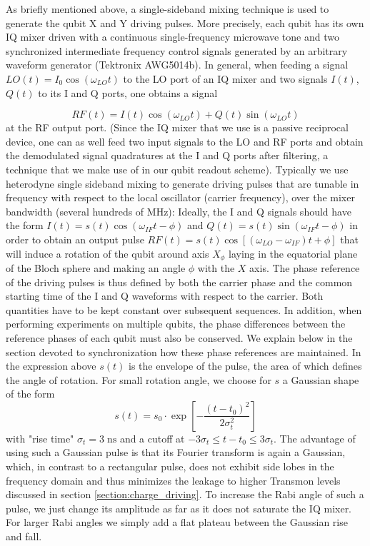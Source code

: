 As briefly mentioned above, a single-sideband mixing technique is used to generate the qubit X and Y driving pulses. More precisely, each qubit has its own IQ mixer driven with a continuous single-frequency microwave tone and two synchronized intermediate frequency control signals generated by an arbitrary waveform generator (Tektronix AWG5014b). In general, when feeding a signal $LO(t) = I_0 \cos{(\omega_{LO} t )}$ to the LO port of an IQ mixer and two signals $I(t)$, $Q(t)$ to its I and Q ports, one obtains a signal

\begin{equation}
RF(t) = I(t)\cos{(\omega_{LO} t)}+Q(t)\sin{(\omega_{LO} t)} \label{eq:iqMixer}
\end{equation}
at the RF output port. (Since the IQ mixer that we use is a passive reciprocal device, one can as well feed two input signals to the LO and RF ports and obtain the demodulated signal quadratures at the I and Q ports after filtering, a technique that we make use of in our qubit readout scheme). Typically we use heterodyne single sideband mixing to generate driving pulses that are tunable in frequency with respect to the local oscillator (carrier  frequency), over the mixer bandwidth (several hundreds of MHz): Ideally, the I and Q signals should have the form $I(t)=s(t)\cos(\omega_{IF} t-\phi)$ and $Q(t)=s(t)\sin(\omega_{IF} t-\phi)$ in order to obtain an output pulse $RF(t)=s(t)\cos[(\omega_{LO}-\omega_{IF})t +\phi]$ that will induce a rotation of the qubit around axis $X_{\phi}$ laying in the equatorial plane of the Bloch sphere and making an angle $\phi$ with the $X$ axis. The phase reference of the driving pulses is thus defined by both the carrier phase and the common starting time of the I and Q waveforms with respect to the carrier. Both quantities have to be kept constant over subsequent sequences. In addition, when performing experiments on multiple qubits, the phase differences between the reference phases of each qubit must also be conserved.  We explain below in the section devoted to synchronization how these phase references are maintained. In the expression above $s(t)$ is the envelope of the pulse, the area of which defines the angle of rotation. For small rotation angle, we choose for $s$ a Gaussian shape of the form
%
\begin{equation}
s(t) = s_0\cdot\exp{\left[-\frac{(t-t_0)^2}{2\sigma_t^2}\right]}
\end{equation}
%
with "rise time" $\sigma_t=3\;\mathrm{ns}$ and a cutoff at $-3\sigma_t\le t-t_0\le 3\sigma_t$. The advantage of using such a Gaussian pulse \citep{bauer_gaussian_1984} is that its Fourier transform is again a Gaussian, which, in contrast to a rectangular pulse, does not exhibit side lobes in the frequency domain and thus minimizes the leakage to higher Transmon levels discussed in section \ref{section:charge_driving}. To increase the Rabi angle of such a pulse, we just change its amplitude as far as it does not saturate the IQ mixer. For larger Rabi angles we simply add a flat plateau between the Gaussian rise and fall.


